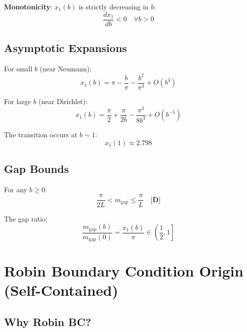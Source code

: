 \documentclass[11pt,a4paper]{article}
\newcommand{\mgap}{m_{\mathrm{gap}}}
\newcommand{\tagD}{\textbf{[D]}}
\theoremstyle{definition}
\theoremstyle{plain}
\theoremstyle{remark}
\begin{document}
\textbf{Monotonicity}: $x_1(b)$ is strictly decreasing in $b$:
\begin{equation}
\frac{dx_1}{db} < 0 \quad \forall b > 0
\label{eq:monotonicity}
\end{equation}

\subsection{Asymptotic Expansions}

For small $b$ (near Neumann):
\begin{equation}
x_1(b) = \pi - \frac{b}{\pi} - \frac{b^2}{\pi^3} + O(b^3)
\label{eq:x1-small-b}
\end{equation}

For large $b$ (near Dirichlet):
\begin{equation}
x_1(b) = \frac{\pi}{2} + \frac{\pi}{2b} - \frac{\pi^3}{8b^3} + O(b^{-5})
\label{eq:x1-large-b}
\end{equation}

The transition occurs at $b \sim 1$:
\begin{equation}
x_1(1) \approx 2.798
\label{eq:x1-transition}
\end{equation}

\subsection{Gap Bounds}

For any $b \geq 0$:
\begin{equation}
\boxed{\frac{\pi}{2L} < \mgap \leq \frac{\pi}{L}} \quad \tagD{}
\label{eq:gap-bounds}
\end{equation}

The gap ratio:
\begin{equation}
\frac{\mgap(b)}{\mgap(0)} = \frac{x_1(b)}{\pi} \in \left(\frac{1}{2}, 1\right]
\label{eq:gap-ratio}
\end{equation}

\section{Robin Boundary Condition Origin (Self-Contained)}
\label{sec:robin-origin}

\subsection{Why Robin BC?}
\end{document}

